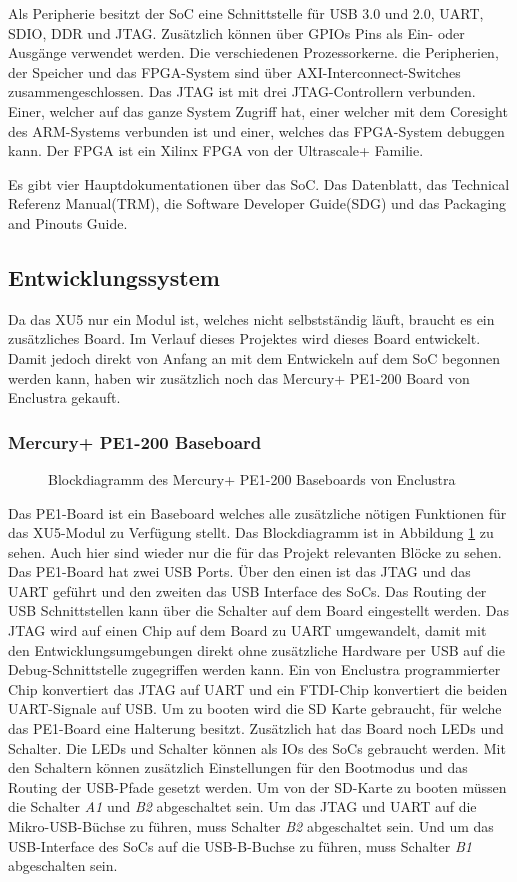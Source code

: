 \documentclass{article}
\begin{document}
Als Peripherie besitzt der SoC eine Schnittstelle für USB 3.0 und 2.0, UART, SDIO, DDR und JTAG. Zusätzlich können über GPIOs Pins als Ein- oder Ausgänge verwendet werden. Die verschiedenen Prozessorkerne. die Peripherien, der Speicher und das FPGA-System sind über AXI-Interconnect-Switches zusammengeschlossen. Das JTAG ist mit drei JTAG-Controllern verbunden. Einer, welcher auf das ganze System Zugriff hat, einer welcher mit dem Coresight des ARM-Systems verbunden ist und einer, welches das FPGA-System debuggen kann. Der FPGA ist ein Xilinx FPGA von der Ultrascale+ Familie. 

Es gibt vier Hauptdokumentationen über das SoC. Das Datenblatt, das Technical Referenz Manual(TRM), die Software Developer Guide(SDG) und das Packaging and Pinouts Guide.


\subsection{Entwicklungssystem}
Da das XU5 nur ein Modul ist, welches nicht selbstständig läuft, braucht es ein zusätzliches Board. Im Verlauf dieses Projektes wird dieses Board entwickelt. Damit jedoch direkt von Anfang an mit dem Entwickeln auf dem SoC begonnen werden kann, haben wir zusätzlich noch das Mercury+ PE1-200 Board von Enclustra gekauft. 

\subsubsection*{Mercury+ PE1-200 Baseboard}
\begin{figure}[tb]
    \caption{Blockdiagramm des Mercury+ PE1-200 Baseboards von Enclustra}
    \label{fig:bd_pe1}
\end{figure}
Das PE1-Board ist ein Baseboard welches alle zusätzliche nötigen Funktionen für das XU5-Modul zu Verfügung stellt.
Das Blockdiagramm ist in Abbildung \ref{fig:bd_pe1} zu sehen. Auch hier sind wieder nur die für das Projekt relevanten Blöcke zu sehen. 
Das PE1-Board hat zwei USB Ports. Über den einen ist das JTAG und das UART geführt und den zweiten das USB Interface des SoCs. Das Routing der USB Schnittstellen kann über die Schalter auf dem Board eingestellt werden. Das JTAG wird auf einen Chip auf dem Board zu UART umgewandelt, damit mit den Entwicklungsumgebungen direkt ohne zusätzliche Hardware per USB auf die Debug-Schnittstelle zugegriffen werden kann. Ein von Enclustra programmierter Chip konvertiert das JTAG auf UART und ein FTDI-Chip konvertiert die beiden UART-Signale auf USB. Um zu booten wird die SD Karte gebraucht, für welche das PE1-Board eine Halterung besitzt. Zusätzlich hat das Board noch LEDs und Schalter. Die LEDs und Schalter können als IOs des SoCs gebraucht werden. Mit den Schaltern können zusätzlich Einstellungen für den Bootmodus und das Routing der USB-Pfade gesetzt werden. Um von der SD-Karte zu booten müssen die Schalter \textit{A1} und \textit{B2} abgeschaltet sein. Um das JTAG und UART auf die Mikro-USB-Büchse zu führen, muss Schalter \textit{B2} abgeschaltet sein. Und um das USB-Interface des SoCs auf die USB-B-Buchse zu führen, muss Schalter \textit{B1} abgeschalten sein. 
\end{document}
